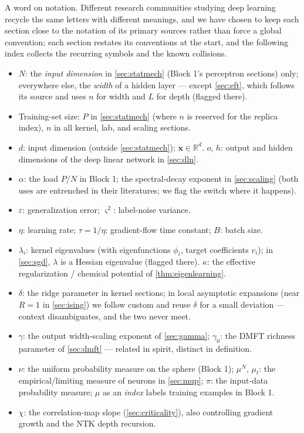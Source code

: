 \documentclass[11pt]{article}
\newcommand{\R}{\mathbb{R}}
\newcommand{\bv}[1]{\boldsymbol{#1}}
\begin{document}
\begin{callout}[note]
A word on notation. Different research communities studying deep learning
recycle the same letters with different meanings, and we have chosen to
keep each section close to the notation of its primary sources rather than
force a global convention; each section restates its conventions at the
start, and the following index collects the recurring symbols and the
known collisions.
\begin{itemize}
  \item $N$: the \emph{input dimension} in \cref{sec:statmech} (Block 1's
  perceptron sections) only; everywhere else, the \emph{width} of a hidden
  layer --- except \cref{sec:eft}, which follows its source and uses $n$
  for width and $L$ for depth (flagged there).
  \item Training-set size: $P$ in \cref{sec:statmech} (where $n$ is
  reserved for the replica index), $n$ in all kernel, lab, and scaling
  sections.
  \item $d$: input dimension (outside \cref{sec:statmech}); $\bv{x} \in
  \R^d$. $o$, $h$: output and hidden dimensions of the deep linear network
  in \cref{sec:dln}.
  \item $\alpha$: the load $P/N$ in Block 1; the spectral-decay exponent
  in \cref{sec:scaling} (both uses are entrenched in their literatures;
  we flag the switch where it happens).
  \item $\varepsilon$: generalization error; $\varsigma^2$: label-noise
  variance.
  \item $\eta$: learning rate; $\tau = 1/\eta$: gradient-flow time
  constant; $B$: batch size.
  \item $\lambda_i$: kernel eigenvalues (with eigenfunctions $\phi_i$,
  target coefficients $v_i$); in \cref{sec:sgd}, $\lambda$ is a Hessian
  eigenvalue (flagged there). $\kappa$: the effective regularization /
  chemical potential of \cref{thm:eigenlearning}.
  \item $\delta$: the ridge parameter in kernel sections; in local
  asymptotic expansions (near $R = 1$ in \cref{sec:ising}) we follow
  custom and reuse $\delta$ for a small deviation --- context
  disambiguates, and the two never meet.
  \item $\gamma$: the output width-scaling exponent of \cref{sec:gamma};
  $\gamma_0$: the DMFT richness parameter of \cref{sec:dmft} --- related
  in spirit, distinct in definition.
  \item $\nu$: the uniform probability measure on the sphere (Block 1);
  $\mu^N$, $\mu_t$: the empirical/limiting measure of neurons in
  \cref{sec:mup}; $\pi$: the input-data probability measure; $\mu$ as an
  \emph{index} labels training examples in Block 1.
  \item $\chi$: the correlation-map slope (\cref{sec:criticality}), also
  controlling gradient growth and the NTK depth recursion.
\end{itemize}
\end{callout}
\end{document}
